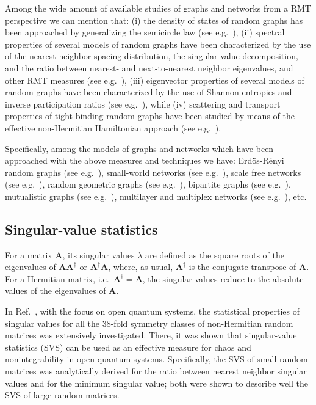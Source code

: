 Among the wide amount of available studies of graphs and networks from a RMT perspective we 
can mention that:
(i) the density of states of random graphs has been approached by generalizing the 
semicircle law (see e.g.~\cite{K15,B19,SJ18}),
(ii) spectral properties of several models of random graphs have been characterized 
by the use of the nearest neighbor spacing distribution, the singular value decomposition, and the 
ratio between nearest- and next-to-nearest neighbor eigenvalues, and other RMT measures 
(see e.g.~\cite{SJ18,BJ07a,BJ07b,BJ08,BJ09,MAMRP15,TFM20,MRJ22,RJ22,RJ23,AMGM18,AMRS20,MMMPS19,MMTM21,MFRM17,PRRCM20,PM23}),
(iii) eigenvector properties of several models of random graphs have been 
characterized by the use of Shannon entropies and inverse participation ratios 
(see e.g.~\cite{JSVL10,JP18,FMRM20,AMGM18,AMRS20,MMMPS19,MMTM21,MFRM17,PRRCM20,PM23,CSTV24}), while
(iv) scattering and transport properties of tight-binding random graphs have been 
studied by means of the effective non-Hermitian Hamiltonian approach 
(see e.g.~\cite{MAM13,MHM24}).

Specifically, among the models of graphs and networks which have been approached with the 
above measures and techniques we have: 
Erd\"os-R\'enyi random graphs (see e.g.~\cite{BJ07a,BJ07b,BJ08,MAMRP15,CSTV24}), 
small-world networks (see e.g.~\cite{BJ07a,BJ07b,BJ08}), 
scale free networks (see e.g.~\cite{BJ07a,BJ07b,BJ08}), 
random geometric graphs (see e.g.~\cite{AMGM18,AMRS20,PM23}), 
bipartite graphs (see e.g.~\cite{MMMPS19}), 
mutualistic graphs (see e.g.~\cite{MMTM21}), 
multilayer and multiplex networks (see e.g.~\cite{MFRM17,JP18,FMRM20,RJ22,RJ23}), etc.


\subsection{Singular-value statistics}

For a matrix $\mathbf{A}$, its singular values $\lambda$ are defined as the square roots of the 
eigenvalues of $\mathbf{A}\mathbf{A}^\dagger$ or $\mathbf{A}^\dagger\mathbf{A}$, where, as usual, 
$\mathbf{A}^\dagger$ is the conjugate transpose of $\mathbf{A}$. For a Hermitian matrix, 
i.e.~$\mathbf{A}^\dagger=\mathbf{A}$, the singular values reduce to the absolute values of the 
eigenvalues of $\mathbf{A}$.

In Ref.~\cite{KXOS23}, with the focus on open quantum systems, the statistical properties of singular 
values for all the 38-fold symmetry classes of non-Hermitian random matrices was extensively investigated.
There, it was shown that singular-value statistics (SVS) can be used as an effective measure for 
chaos and nonintegrability in open quantum systems. Specifically, the SVS of small random matrices
was analytically derived for the ratio between nearest neighbor singular values and for the minimum 
singular value; both were shown to describe well the SVS of large random matrices.

